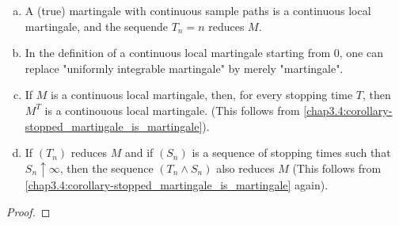 \begin{properties}\label{chap4.2:properties-properties_of_continuous_local_martingale}
\begin{enumerate}[(a)]
    \item A (true) martingale with continuous sample paths is a continuous local martingale, and the sequende $T_n=n$ reduces $M$.
    \item In the definition of a continuous local martingale starting from 0, one can replace "uniformly integrable martingale" by merely "martingale".
    \item If $M$ is a continuous local martingale, then, for every stopping time $T$, then $M^T$ is a continouous local martingale. (This follows from \cref{chap3.4:corollary-stopped_martingale_is_martingale}).
    \item If $(T_n)$ reduces $M$ and if $(S_n)$ is a sequence of stopping times such that $S_n \uparrow \infty$, then the sequence $(T_n \land S_n)$ also reduces $M$ (This follows from \cref{chap3.4:corollary-stopped_martingale_is_martingale} again).
\end{enumerate}
\end{properties}
\begin{proof}
\end{proof}


